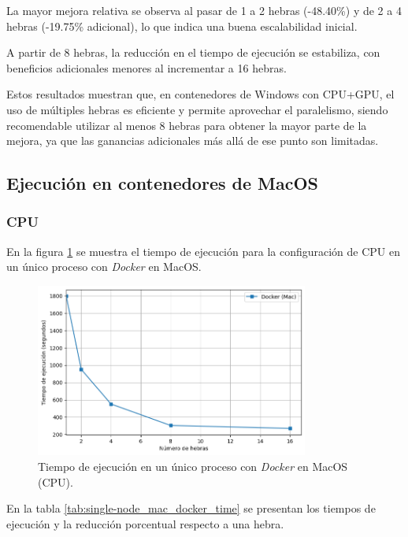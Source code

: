 La mayor mejora relativa se observa al pasar de 1 a 2 hebras (-48.40\%) y de 2 a 4 hebras (-19.75\% adicional), lo que indica una buena escalabilidad inicial.

A partir de 8 hebras, la reducción en el tiempo de ejecución se estabiliza, con beneficios adicionales menores al incrementar a 16 hebras.

Estos resultados muestran que, en contenedores de Windows con CPU+GPU, el uso de múltiples hebras es eficiente y permite aprovechar el paralelismo, siendo recomendable utilizar al menos 8 hebras para obtener la mayor parte de la mejora, ya que las ganancias adicionales más allá de ese punto son limitadas.

\subsection{Ejecución en contenedores de MacOS}
\subsubsection{CPU}

En la figura \ref{fig:single-node_mac_docker_time} se muestra el tiempo de ejecución para la configuración de CPU en un único proceso con \textit{Docker} en MacOS.

\begin{figure}[ht]
    \centering
    \includegraphics[width=0.8\textwidth]{imagenes/cap5/single-node_mac_docker_time.png}
    \caption{Tiempo de ejecución en un único proceso con \textit{Docker} en MacOS (CPU).}
    \label{fig:single-node_mac_docker_time}
\end{figure}

En la tabla \ref{tab:single-node_mac_docker_time} se presentan los tiempos de ejecución y la reducción porcentual respecto a una hebra.

